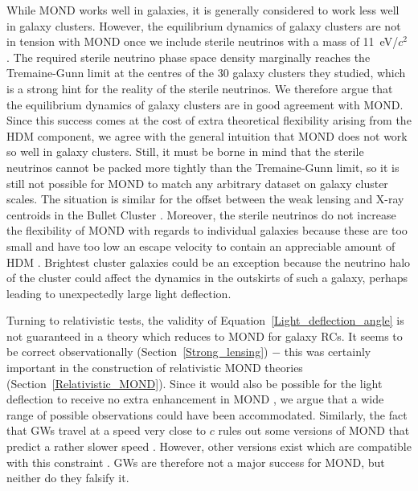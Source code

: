 \documentclass[fleqn,usenatbib,useAMS]{mnras} %
\begin{document}
While MOND works well in galaxies, it is generally considered to work less well in galaxy clusters. However, the equilibrium dynamics of galaxy clusters are not in tension with MOND once we include sterile neutrinos with a mass of 11~eV/$c^2$ \citep{Angus_2010}. The required sterile neutrino phase space density marginally reaches the Tremaine-Gunn limit at the centres of the 30 galaxy clusters they studied, which is a strong hint for the reality of the sterile neutrinos. We therefore argue that the equilibrium dynamics of galaxy clusters are in good agreement with MOND. Since this success comes at the cost of extra theoretical flexibility arising from the HDM component, we agree with the general intuition that MOND does not work so well in galaxy clusters. Still, it must be borne in mind that the sterile neutrinos cannot be packed more tightly than the Tremaine-Gunn limit, so it is still not possible for MOND to match any arbitrary dataset on galaxy cluster scales. The situation is similar for the offset between the weak lensing and X-ray centroids in the Bullet Cluster \citep[which is consistent with MOND even with a lower sterile neutrino mass of only 2~eV/$c^2$;][]{Angus_2007}. Moreover, the sterile neutrinos do not increase the flexibility of MOND with regards to individual galaxies because these are too small and have too low an escape velocity to contain an appreciable amount of HDM \citep{Angus_2010_minimum_neutrino_mass}. Brightest cluster galaxies could be an exception because the neutrino halo of the cluster could affect the dynamics in the outskirts of such a galaxy, perhaps leading to unexpectedly large light deflection.

Turning to relativistic tests, the validity of Equation~\ref{Light_deflection_angle} is not guaranteed in a theory which reduces to MOND for galaxy RCs. It seems to be correct observationally (Section~\ref{Strong_lensing}) $-$ this was certainly important in the construction of relativistic MOND theories (Section~\ref{Relativistic_MOND}). Since it would also be possible for the light deflection to receive no extra enhancement in MOND \citep{Sanders_1997}, we argue that a wide range of possible observations could have been accommodated. Similarly, the fact that GWs travel at a speed very close to $c$ \citep{LIGO_Virgo_2017} rules out some versions of MOND that predict a rather slower speed \citep{Boran_2018}. However, other versions exist which are compatible with this constraint \citep{Sanders_2018, Skordis_2019}. GWs are therefore not a major success for MOND, but neither do they falsify it.
\end{document}

